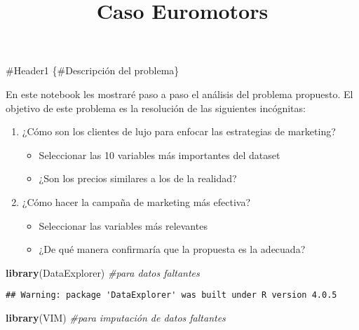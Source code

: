 \documentclass[
]{article}
\title{Caso Euromotors}
\author{}
\date{\vspace{-2.5em}}
\newenvironment{Shaded}{\begin{snugshade}}{\end{snugshade}}
\newcommand{\CommentTok}[1]{\textcolor[rgb]{0.56,0.35,0.01}{\textit{#1}}}
\newcommand{\KeywordTok}[1]{\textcolor[rgb]{0.13,0.29,0.53}{\textbf{#1}}}
\newcommand{\NormalTok}[1]{#1}
\providecommand{\tightlist}{%
  \setlength{\itemsep}{0pt}\setlength{\parskip}{0pt}}
\begin{document}
\maketitle

\#Header1 \{\#Descripción del problema\}

En este notebook les mostraré paso a paso el análisis del problema
propuesto. El objetivo de este problema es la resolución de las
siguientes incógnitas:

\begin{enumerate}
\def\labelenumi{\arabic{enumi}.}
\tightlist
\item
  ¿Cómo son los clientes de lujo para enfocar las estrategias de
  marketing?

  \begin{itemize}
  \tightlist
  \item
    Seleccionar las 10 variables más importantes del dataset
  \item
    ¿Son los precios similares a los de la realidad?
  \end{itemize}
\item
  ¿Cómo hacer la campaña de marketing más efectiva?

  \begin{itemize}
  \tightlist
  \item
    Seleccionar las variables más relevantes
  \item
    ¿De qué manera confirmaría que la propuesta es la adecuada?
  \end{itemize}
\end{enumerate}

\pagebreak

\begin{Shaded}
\begin{Highlighting}[]
\KeywordTok{library}\NormalTok{(DataExplorer) }\CommentTok{#para datos faltantes}
\end{Highlighting}
\end{Shaded}

\begin{verbatim}
## Warning: package 'DataExplorer' was built under R version 4.0.5
\end{verbatim}

\begin{Shaded}
\begin{Highlighting}[]
\KeywordTok{library}\NormalTok{(VIM) }\CommentTok{#para imputación de datos faltantes}
\end{Highlighting}
\end{Shaded}
\end{document}
